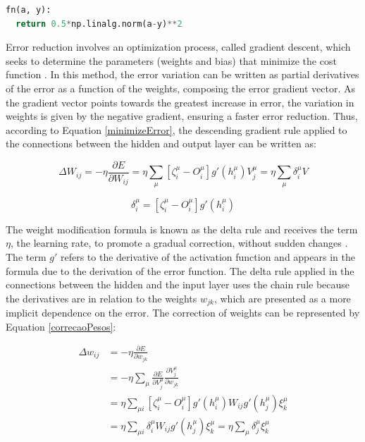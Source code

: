 \begin{lstlisting}[caption={Delta method in Python},label={lst:fn},language=Python]
fn(a, y):
  return 0.5*np.linalg.norm(a-y)**2
\end{lstlisting}



Error reduction involves an optimization process, called gradient descent, which seeks to determine the parameters (weights and bias) that minimize the cost function \cite{nielsen2015}. In this method, the error variation can be written as partial derivatives of the error as a function of the weights, composing the error gradient vector. As the gradient vector points towards the greatest increase in error, the variation in weights is given by the negative gradient, ensuring a faster error reduction. Thus, according to Equation \ref{minimizeError}, the descending gradient rule applied to the connections between the hidden and output layer can be written as:

\begin{equation}
\label{minimizeError}
\Delta W_{ij}=-\eta\frac{\partial E}{\partial W_{ij}}=\eta\sum_\mu[\zeta_i^\mu-O_i^\mu]g'(h_i^\mu)V_j^\mu=\eta\sum_\mu\delta_i^\mu V
\end{equation}

\begin{equation*}
\delta_i^\mu=[\zeta_i^\mu-O_i^\mu]g'(h_i^\mu)
\end{equation*}

The weight modification formula is known as the delta rule and receives the term $\eta$, the learning rate, to promote a gradual correction, without sudden changes \cite{nielsen2015}. The term $g'$ refers to the derivative of the activation function and appears in the formula due to the derivation of the error function. The delta rule applied in the connections between the hidden and the input layer uses the chain rule because the derivatives are in relation to the weights $w_{jk}$, which are presented as a more implicit dependence on the error. The correction of weights can be represented by Equation \ref{correcaoPesos}:

\begin{equation}
\begin{split}
\Delta w_{ij}&=-\eta\frac{\partial E}{\partial w_{jk}}\\&=-\eta\sum_\mu\frac{\partial E}{\partial V_j^\mu}\frac{\partial V_j^\mu}{\partial w_{jk}}\\&=\eta\sum_{\mu i}[\zeta_i^\mu-O_i^\mu]g'(h_i^\mu)W_{ij}g'(h_j^\mu)\xi_k^\mu
\\&=\eta\sum_{\mu i}\delta_i^\mu W_{ij}g'(h_j^\mu)\xi_k^\mu=\eta\sum_\mu\delta_j^\mu\xi_k^\mu
\end{split}
\label{correcaoPesos}
\end{equation}

